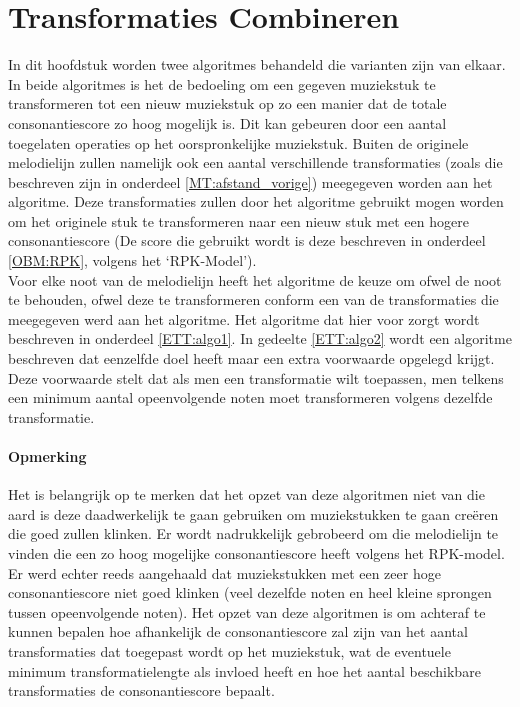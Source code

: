 \chapter{Transformaties Combineren}
\label{hoofdstuk:ETT}

In dit hoofdstuk worden twee algoritmes behandeld die varianten zijn van elkaar. In beide algoritmes is het de bedoeling om een gegeven muziekstuk te transformeren tot een nieuw muziekstuk op zo een manier dat de totale consonantiescore zo hoog mogelijk is. Dit kan gebeuren door een aantal toegelaten operaties op het oorspronkelijke muziekstuk. Buiten de originele melodielijn zullen namelijk ook een aantal verschillende transformaties (zoals die beschreven zijn in onderdeel \ref{MT:afstand_vorige}) meegegeven worden aan het algoritme. Deze transformaties zullen door het algoritme gebruikt mogen worden om het originele stuk te transformeren naar een nieuw stuk met een hogere consonantiescore (De score die gebruikt wordt is deze beschreven in onderdeel \ref{OBM:RPK}, volgens het `RPK-Model').\\ 
Voor elke noot van de melodielijn heeft het algoritme de keuze om ofwel de noot te behouden, ofwel deze te transformeren conform een van de transformaties die meegegeven werd aan het algoritme. Het algoritme dat hier voor zorgt wordt beschreven in onderdeel \ref{ETT:algo1}. In gedeelte \ref{ETT:algo2} wordt een algoritme beschreven dat eenzelfde doel heeft maar een extra voorwaarde opgelegd krijgt. Deze voorwaarde stelt dat als men een transformatie wilt toepassen, men telkens een minimum aantal opeenvolgende noten moet transformeren volgens dezelfde transformatie.

\subsubsection{Opmerking}
Het is belangrijk op te merken dat het opzet van deze algoritmen niet van die aard is deze daadwerkelijk te gaan gebruiken om muziekstukken te gaan cre\"eren die goed zullen klinken. Er wordt nadrukkelijk gebrobeerd om die melodielijn te vinden die een zo hoog mogelijke consonantiescore heeft volgens het RPK-model. Er werd echter reeds aangehaald dat muziekstukken met een zeer hoge consonantiescore niet goed klinken (veel dezelfde noten en heel kleine sprongen tussen opeenvolgende noten). Het opzet van deze algoritmen is om achteraf te kunnen bepalen hoe afhankelijk de consonantiescore zal zijn van het aantal transformaties dat toegepast wordt op het muziekstuk, wat de eventuele minimum transformatielengte als invloed heeft en hoe het aantal beschikbare transformaties de consonantiescore bepaalt.

